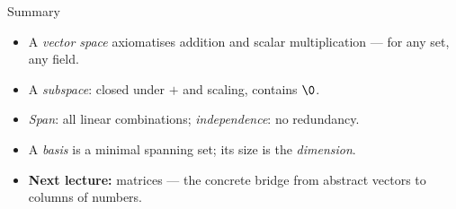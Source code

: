 \begin{frame}{Summary}
\begin{itemize}
\item A \emph{vector space} axiomatises addition and scalar multiplication — for any set, any field.
\pause
\item A \emph{subspace}: closed under $+$ and scaling, contains $\0$.
\pause
\item \emph{Span}: all linear combinations; \emph{independence}: no redundancy.
\pause
\item A \emph{basis} is a minimal spanning set; its size is the \emph{dimension}.
\pause
\item \textbf{Next lecture:} matrices — the concrete bridge from abstract vectors to columns of numbers.
\end{itemize}
\end{frame}
